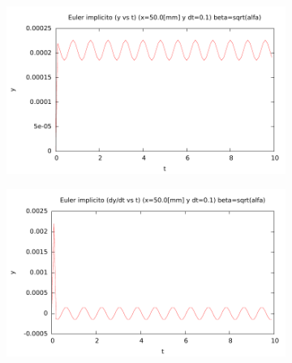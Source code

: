 
\begin{center}
\begin{figure} [H]
	\begin{subfigure}[b]{0.3\textwidth}
		\includegraphics{./parte3/graficos/grafico_euler_S2_y_b1.pdf}
		\caption{} 
		\label{fig:eulerS2b1_y}
	\end{subfigure}
	
	\begin{subfigure}[b]{0.3\textwidth}
		\includegraphics{./parte3/graficos/grafico_euler_S2_dy_b1.pdf}
		\caption{} 
		\label{fig:eulerS2b1_dy}
	\end{subfigure}
\end{figure}
\end{center}

